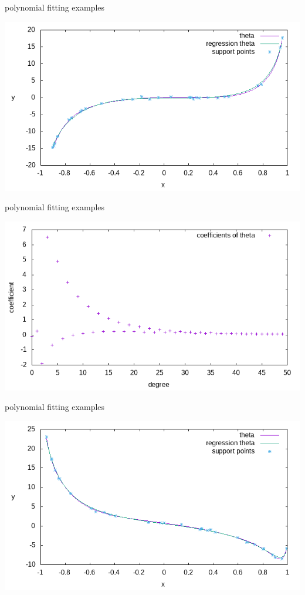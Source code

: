\documentclass{beamer}
\begin{document}
\begin{frame}{polynomial fitting examples}
\begin{center}
\includegraphics[scale=0.6]{source/theta_plot_1.png}
\end{center}
\end{frame}

\begin{frame}{polynomial fitting examples}
\begin{center}
\includegraphics[scale=0.6]{source/theta_coefficients_1.png}
\end{center}
\end{frame}

\begin{frame}{polynomial fitting examples}
\begin{center}
\includegraphics[scale=0.6]{source/theta_plot_2.png}
\end{center}
\end{frame}
\end{document}
